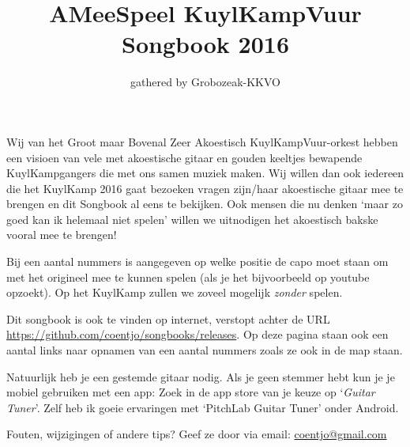 \documentclass[a4,openany,landscape]{article}
\title{AMeeSpeel KuylKampVuur Songbook 2016}
\author{gathered by Grobozeak-KKVO}
\begin{document}

\maketitle
Wij van het Groot maar Bovenal Zeer Akoestisch KuylKampVuur-orkest hebben een visioen van vele met akoestische gitaar en gouden keeltjes bewapende KuylKampgangers die met ons samen muziek maken. Wij willen dan ook iedereen die het KuylKamp 2016 gaat bezoeken vragen zijn/haar akoestische gitaar mee te brengen en dit Songbook al eens te bekijken. Ook mensen die nu denken `maar zo goed kan ik helemaal niet spelen' willen we uitnodigen het akoestisch bakske vooral mee te brengen! 

Bij een aantal nummers is aangegeven op welke positie de capo moet staan om met het origineel mee te kunnen spelen (als je het bijvoorbeeld op youtube opzoekt). Op het KuylKamp zullen we zoveel mogelijk \emph{zonder} spelen.  

Dit songbook is ook te vinden op internet, verstopt achter de URL 
\url{https://github.com/coentjo/songbooks/releases}. 
Op deze pagina staan ook een aantal links naar opnamen van een aantal nummers zoals ze ook in de map staan.  


Natuurlijk heb je een gestemde gitaar nodig. Als je geen stemmer hebt kun je je mobiel gebruiken met een app: Zoek in de app store van je keuze op `\emph{Guitar Tuner}'. Zelf heb ik goeie ervaringen met `PitchLab Guitar Tuner' onder Android. 

Fouten, wijzigingen of andere tips? Geef ze door via email:   \href{mailto:coentjo@gmail.com}{coentjo@gmail.com} 





\end{document}
